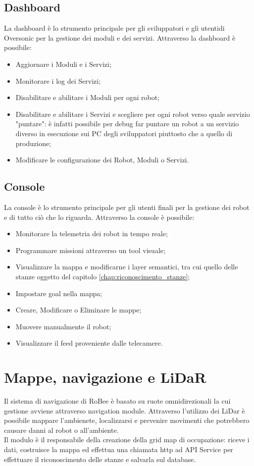 \subsection{Dashboard}
La dashboard è lo strumento principale per gli sviluppatori e gli utentidi Oversonic per la gestione dei moduli e dei servizi. Attraverso la dashboard è possibile:
\begin{itemize}
  \item Aggiornare i Moduli e i Servizi;
  \item Monitorare i log dei Servizi;
  \item Disabilitare e abilitare i Moduli per ogni robot;
  \item Disabilitare e abilitare i Servizi e scegliere per ogni robot verso quale servizio "puntare": è infatti possibile per debug far puntare un robot a un servizio diverso in esecuzione sui PC degli sviluppatori piuttosto che a quello di produzione;
  \item Modificare le configurazione dei Robot, Moduli o Servizi.
\end{itemize}
\subsection{Console}
La console è lo strumento principale per gli utenti finali per la gestione dei robot e di tutto ciò che lo riguarda. Attraverso la console è possibile:
\begin{itemize}
  \item Monitorare la telemetria dei robot in tempo reale;
  \item Programmare missioni attraverso un tool visuale;
  \item Visualizzare la mappa e modificarne i layer semantici, tra cui quello delle stanze oggetto del capitolo \ref{chap:riconoscimento_stanze};
  \item Impostare goal nella mappa;
  \item Creare, Modificare o Eliminare le mappe;
  \item Muovere manualmente il robot;
  \item Visualizzare il feed proveniente dalle telecamere.
\end{itemize}

\section{Mappe, navigazione e LiDaR}
Il sistema di navigazione di RoBee è basato su ruote omnidirezionali la cui gestione avviene attraverso navigation module. Attraverso l'utilizzo dei LiDar è possibile mappare l'ambienete, localizzarsi e prevenire movimenti che potrebbero causare danni al robot o all'ambiente.\\
Il modulo è il responsabile della creazione della grid map di occupazione: riceve i dati, costruisce la mappa ed effettua una chiamata http ad API Service per effettuare il riconoscimento delle stanze e salvarla sul database.

